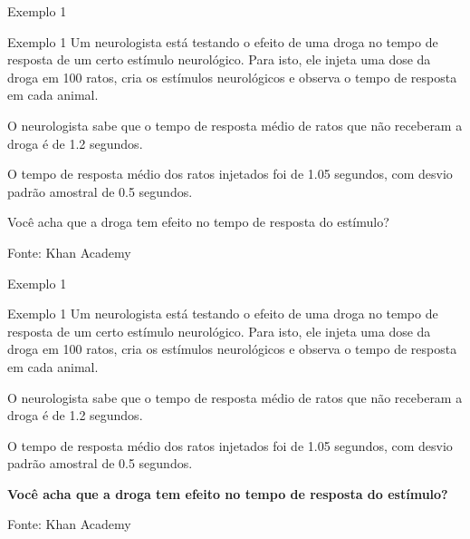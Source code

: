\documentclass{beamer}
\begin{document}
\begin{frame}{Exemplo 1}
  \begin{exampleblock}{Exemplo 1}
    \footnotesize
    Um neurologista está testando o efeito de uma droga no tempo de
    resposta de um certo estímulo neurológico.
    Para isto, ele injeta uma dose da droga em 100 ratos, cria
    os estímulos neurológicos e observa o tempo de resposta em cada
    animal.

    \smallskip
    O neurologista sabe que o tempo de resposta médio de ratos que não
    receberam a droga é de 1.2 segundos.

    \smallskip
    O tempo de resposta médio dos ratos injetados foi de
    1.05 segundos, com desvio padrão amostral de
    0.5 segundos.
  \end{exampleblock}
  \begin{block}{}
    Você acha que a droga tem efeito no tempo de resposta do estímulo?
  \end{block}
  \hfill {\scriptsize Fonte: Khan Academy}
\end{frame}

\begin{frame}[label=exemplo1]{Exemplo 1}
  \begin{exampleblock}{Exemplo 1}
    \footnotesize
    Um neurologista está testando o efeito de uma droga no tempo de
    resposta de um certo estímulo neurológico.
    Para isto, ele injeta uma dose da droga em \alert{100} ratos, cria
    os estímulos neurológicos e observa o tempo de resposta em cada
    animal.

    \smallskip
    O neurologista sabe que o tempo de resposta médio de ratos que não
    receberam a droga é de \alert{1.2 segundos}.

    \smallskip
    O tempo de resposta médio dos ratos injetados foi de
    \alert{1.05 segundos}, com desvio padrão amostral de
    \alert{0.5 segundos}.
  \end{exampleblock}
  \begin{block}{}
    {\bf Você acha que a droga tem efeito no tempo de resposta do estímulo?}
  \end{block}
  \hfill {\scriptsize Fonte: Khan Academy}
\end{frame}
\end{document}
